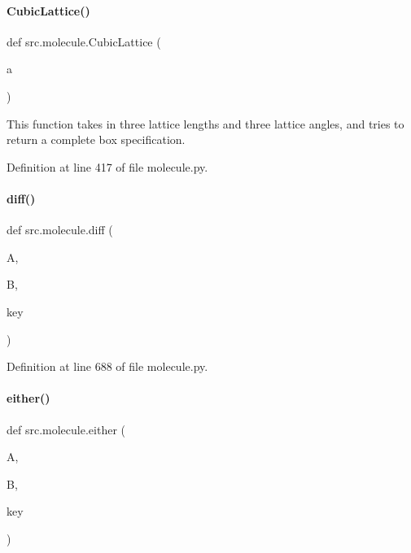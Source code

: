 \paragraph{\texorpdfstring{Cubic\+Lattice()}{CubicLattice()}}
{\footnotesize\ttfamily def src.\+molecule.\+Cubic\+Lattice (\begin{DoxyParamCaption}\item[{}]{a }\end{DoxyParamCaption})}



This function takes in three lattice lengths and three lattice angles, and tries to return a complete box specification. 



Definition at line 417 of file molecule.\+py.

\mbox{\label{namespacesrc_1_1molecule_a9de48d83dc7f53e25b86a4a6076e3185}} 
\paragraph{\texorpdfstring{diff()}{diff()}}
{\footnotesize\ttfamily def src.\+molecule.\+diff (\begin{DoxyParamCaption}\item[{}]{A,  }\item[{}]{B,  }\item[{}]{key }\end{DoxyParamCaption})}



Definition at line 688 of file molecule.\+py.

\mbox{\label{namespacesrc_1_1molecule_a53a3e04b9a57f9217a193d92c2062890}} 
\paragraph{\texorpdfstring{either()}{either()}}
{\footnotesize\ttfamily def src.\+molecule.\+either (\begin{DoxyParamCaption}\item[{}]{A,  }\item[{}]{B,  }\item[{}]{key }\end{DoxyParamCaption})}



